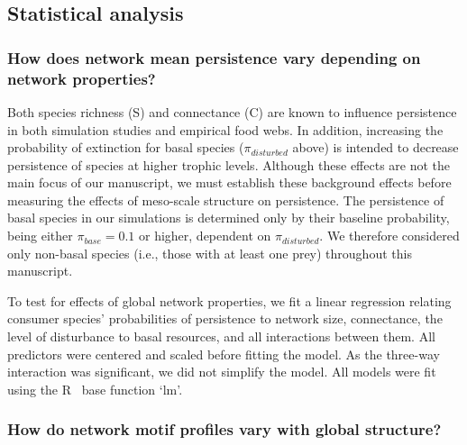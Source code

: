 \documentclass[12pt]{article}
\begin{document}
\begin{spacing}{2.0}
	\subsection*{Statistical analysis} 

        \subsubsection*{How does network mean persistence vary depending on network properties?}
        
            Both species richness (S) and connectance (C) are known to influence persistence in both simulation studies and empirical food webs.
            In addition, increasing the probability of extinction for basal species ($\pi_{disturbed}$ above) is intended to decrease persistence of species at higher trophic levels.
            Although these effects are not the main focus of our manuscript, we must establish these background effects before measuring the effects of meso-scale structure on persistence.
            The persistence of basal species in our simulations is determined only by their baseline probability, being either $\pi_{base} = 0.1$ or higher, dependent on $\pi_{disturbed}$.
            We therefore considered only non-basal species (i.e., those with at least one prey) throughout this manuscript.

            To test for effects of global network properties, we fit a linear regression relating consumer species' probabilities of persistence to network size, connectance, the level of disturbance to basal resources, and all interactions between them. 
            All predictors were centered and scaled before fitting the model. 
            As the three-way interaction was significant, we did not simplify the model.
            All models were fit using the R~\citep{R} base function `lm'.

        
        \subsubsection*{How do network motif profiles vary with global structure?}
        

\end{spacing}
\end{document}
